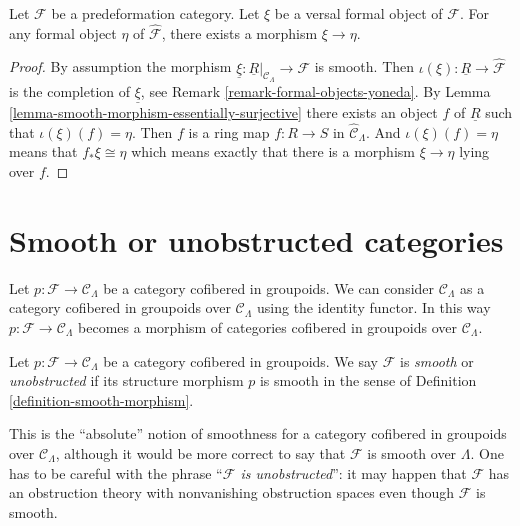 \begin{lemma}
\label{lemma-versal-object-quasi-initial}
Let $\mathcal{F}$ be a predeformation category.
Let $\xi$ be a versal formal object of $\mathcal{F}$.
For any formal object $\eta$ of $\widehat{\mathcal{F}}$,
there exists a morphism $\xi \to \eta$.
\end{lemma}

\begin{proof}
By assumption the morphism
$\underline{\xi} : \underline{R}|_{\mathcal{C}_\Lambda} \to \mathcal{F}$
is smooth. Then
$\iota(\xi) : \underline{R} \to \widehat{\mathcal{F}}$
is the completion of $\underline{\xi}$, see
Remark \ref{remark-formal-objects-yoneda}.
By
Lemma \ref{lemma-smooth-morphism-essentially-surjective}
there exists an object $f$ of $\underline{R}$ such that
$\iota(\xi)(f) = \eta$. Then $f$ is
a ring map $f : R \to S$ in $\widehat{\mathcal{C}}_\Lambda$. And
$\iota(\xi)(f) = \eta$ means that
$f_*\xi \cong \eta$ which means exactly that there is a morphism
$\xi \to \eta$ lying over $f$.
\end{proof}





\section{Smooth or unobstructed categories}
\label{section-smooth}

\noindent
Let $p : \mathcal{F} \to \mathcal{C}_\Lambda$ be a category cofibered in
groupoids. We can consider $\mathcal{C}_\Lambda$ as a category
cofibered in groupoids over $\mathcal{C}_\Lambda$ using the identity
functor. In this way
$p : \mathcal{F} \longrightarrow \mathcal{C}_\Lambda$
becomes
a morphism of categories cofibered in groupoids over $\mathcal{C}_\Lambda$.

\begin{definition}
\label{definition-cofibered-groupoid-projection-smooth}
Let $p : \mathcal{F} \to \mathcal{C}_\Lambda$ be a category cofibered in
groupoids. We say $\mathcal{F}$ is {\it smooth} or {\it unobstructed}
if its structure morphism $p$ is smooth
in the sense of Definition \ref{definition-smooth-morphism}.
\end{definition}

\noindent
This is the ``absolute'' notion of smoothness for a
category cofibered in groupoids over $\mathcal{C}_\Lambda$, although
it would be more correct to say that $\mathcal{F}$ is smooth over $\Lambda$.
One has to be careful with the phrase ``{\it $\mathcal{F}$ is unobstructed}'':
it may happen that
$\mathcal{F}$ has an obstruction theory with nonvanishing obstruction spaces
even though $\mathcal{F}$ is smooth.

